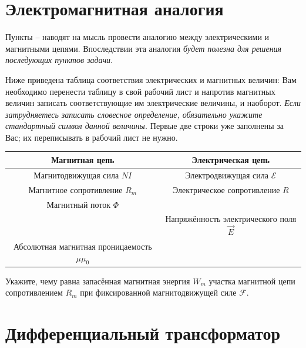 \part{Электромагнитная аналогия}

Пункты -- наводят на мысль провести аналогию между электрическими и магнитными цепями. Впоследствии эта аналогия \textit{будет полезна для решения последующих пунктов задачи}.

\begin{task}
    \item Ниже приведена таблица соответствия электрических и магнитных величин: Вам необходимо перенести таблицу в свой рабочий лист и напротив магнитных величин записать соответствующие им электрические величины, и наоборот. \textit{Если затрудняетесь записать словесное определение, обязательно укажите стандартный символ данной величины.} Первые две строки уже заполнены за Вас; их переписывать в рабочий лист не нужно.
    \begin{center}
    \begin{tabular}{|c|c|}\hline
         \textbf{Магнитная цепь}& \textbf{Электрическая цепь} \\\hline
         Магнитодвижущая сила $NI$& Электродвижущая сила $\mathcal E$\\\hline
         Магнитное сопротивление $R_m$& Электрическое сопротивление $R$\\\hline
         Магнитный поток $\Phi$ &\\\hline
         &Напряжённость электрического поля $\vec E$ \\\hline
         Абсолютная магнитная проницаемость $\mu\mu_0$&\\\hline
    \end{tabular}
    \end{center}
    
    \item Укажите, чему равна запасённая магнитная энергия $W_m$ участка магнитной цепи сопротивлением $R_m$ при фиксированной магнитодвижущей силе $\mathcal F$.
\end{task}

\part{Дифференциальный трансформатор}


